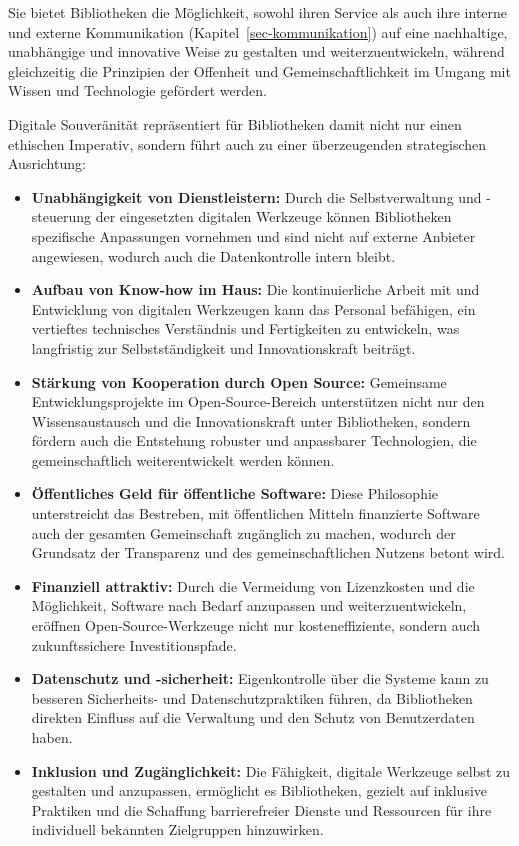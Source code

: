 \documentclass[
  11pt,
  letterpaper,
  DIV=11,
  twoside]{scrreprt}
\begin{document}
Sie bietet Bibliotheken die Möglichkeit, sowohl ihren Service als auch
ihre interne und externe Kommunikation (Kapitel~\ref{sec-kommunikation})
auf eine nachhaltige, unabhängige und innovative Weise zu gestalten und
weiterzuentwickeln, während gleichzeitig die Prinzipien der Offenheit
und Gemeinschaftlichkeit im Umgang mit Wissen und Technologie gefördert
werden.

Digitale Souveränität repräsentiert für Bibliotheken damit nicht nur
einen ethischen Imperativ, sondern führt auch zu einer überzeugenden
strategischen Ausrichtung:

\begin{itemize}
\item
  \textbf{Unabhängigkeit von Dienstleistern:} Durch die Selbstverwaltung
  und -steuerung der eingesetzten digitalen Werkzeuge können
  Bibliotheken spezifische Anpassungen vornehmen und sind nicht auf
  externe Anbieter angewiesen, wodurch auch die Datenkontrolle intern
  bleibt.
\item
  \textbf{Aufbau von Know-how im Haus:} Die kontinuierliche Arbeit mit
  und Entwicklung von digitalen Werkzeugen kann das Personal befähigen,
  ein vertieftes technisches Verständnis und Fertigkeiten zu entwickeln,
  was langfristig zur Selbstständigkeit und Innovationskraft beiträgt.
\item
  \textbf{Stärkung von Kooperation durch Open Source:} Gemeinsame
  Entwicklungsprojekte im Open-Source-Bereich unterstützen nicht nur den
  Wissensaustausch und die Innovationskraft unter Bibliotheken, sondern
  fördern auch die Entstehung robuster und anpassbarer Technologien, die
  gemeinschaftlich weiterentwickelt werden können.
\item
  \textbf{Öffentliches Geld für öffentliche Software:} Diese Philosophie
  unterstreicht das Bestreben, mit öffentlichen Mitteln finanzierte
  Software auch der gesamten Gemeinschaft zugänglich zu machen, wodurch
  der Grundsatz der Transparenz und des gemeinschaftlichen Nutzens
  betont wird.
\item
  \textbf{Finanziell attraktiv:} Durch die Vermeidung von Lizenzkosten
  und die Möglichkeit, Software nach Bedarf anzupassen und
  weiterzuentwickeln, eröffnen Open-Source-Werkzeuge nicht nur
  kosteneffiziente, sondern auch zukunftssichere Investitionspfade.
\item
  \textbf{Datenschutz und -sicherheit:} Eigenkontrolle über die Systeme
  kann zu besseren Sicherheits- und Datenschutzpraktiken führen, da
  Bibliotheken direkten Einfluss auf die Verwaltung und den Schutz von
  Benutzerdaten haben.
\item
  \textbf{Inklusion und Zugänglichkeit:} Die Fähigkeit, digitale
  Werkzeuge selbst zu gestalten und anzupassen, ermöglicht es
  Bibliotheken, gezielt auf inklusive Praktiken und die Schaffung
  barrierefreier Dienste und Ressourcen für ihre individuell bekannten
  Zielgruppen hinzuwirken.
\end{itemize}
\end{document}
